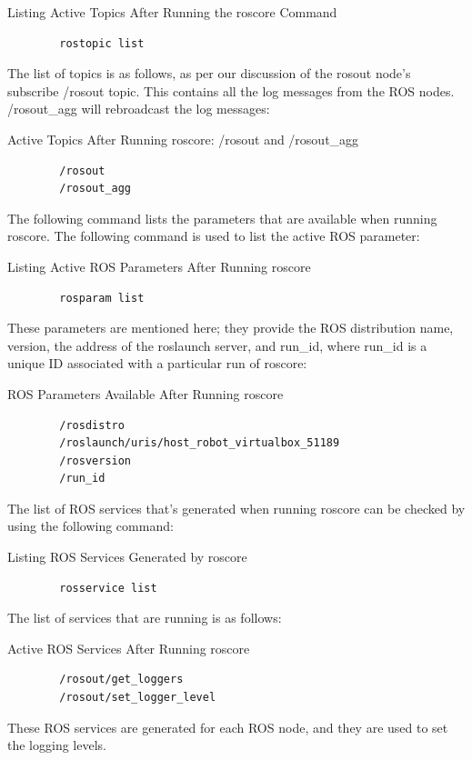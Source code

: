 \documentclass[../../main]{subfiles}
\begin{document}
\begin{codebox}[]{Listing Active Topics After Running the roscore Command}    
    \begin{verbatim}
        rostopic list
    \end{verbatim}
    \end{codebox}

The list of topics is as follows, as per our discussion of the rosout node's subscribe /rosout topic. This contains all the log messages from the ROS nodes. /rosout\_agg will rebroadcast the log messages:

\begin{codebox}[]{Active Topics After Running roscore: /rosout and /rosout\_agg}    
    \begin{verbatim}
        /rosout
        /rosout_agg
    \end{verbatim}
    \end{codebox}

The following command lists the parameters that are available when running roscore. The following command is used to list the active ROS parameter:

\begin{codebox}[]{Listing Active ROS Parameters After Running roscore}    
    \begin{verbatim}
        rosparam list
    \end{verbatim}
    \end{codebox}

These parameters are mentioned here; they provide the ROS distribution name, version, the address of the roslaunch server, and run\_id, where run\_id is a unique ID associated with a particular run of roscore:
\begin{codebox}[]{ROS Parameters Available After Running roscore}
    
    \begin{verbatim}
        /rosdistro
        /roslaunch/uris/host_robot_virtualbox_51189
        /rosversion
        /run_id
    \end{verbatim}
    \end{codebox}

The list of ROS services that's generated when running roscore can be checked by using the following command:

\begin{codebox}[]{Listing ROS Services Generated by roscore}
    \begin{verbatim}
        rosservice list
    \end{verbatim}
    \end{codebox}

The list of services that are running is as follows:

\begin{codebox}[]{Active ROS Services After Running roscore}
    
    \begin{verbatim}
        /rosout/get_loggers
        /rosout/set_logger_level
    \end{verbatim}
    \end{codebox}


These ROS services are generated for each ROS node, and they are used to set the logging
levels.
\end{document}
